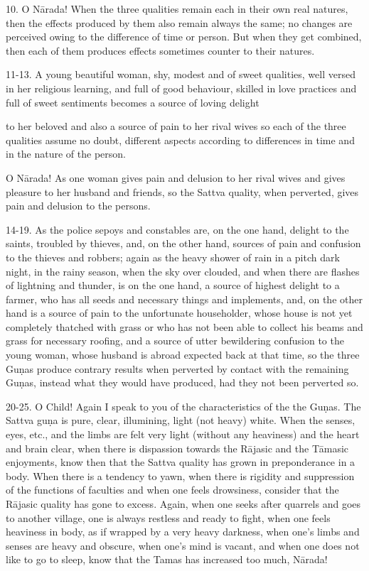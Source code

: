 10. O N\=arada! When the three qualities remain each in their own real natures, then the effects produced by them also remain always the same; no changes are perceived owing to the difference of time or person. But when they get combined, then each of them produces effects sometimes counter to their natures.

11-13. A young beautiful woman, shy, modest and of sweet qualities, well versed in her religious learning, and full of good behaviour, skilled in love practices and full of sweet sentiments becomes a source of loving delight

to her beloved and also a source of pain to her rival wives so each of the three qualities assume no doubt, different aspects according to differences in time and in the nature of the person.

O N\=arada! As one woman gives pain and delusion to her rival wives and gives pleasure to her husband and friends, so the Sattva quality, when perverted, gives pain and delusion to the persons.

14-19. As the police sepoys and constables are, on the one hand, delight to the saints, troubled by thieves, and, on the other hand, sources of pain and confusion to the thieves and robbers; again as the heavy shower of rain in a pitch dark night, in the rainy season, when the sky over clouded, and when there are flashes of lightning and thunder, is on the one hand, a source of highest delight to a farmer, who has all seeds and necessary things and implements, and, on the other hand is a source of pain to the unfortunate householder, whose house is not yet completely thatched with grass or who has not been able to collect his beams and grass for necessary roofing, and a source of utter bewildering confusion to the young woman, whose husband is abroad expected back at that time, so the three Gu\d{n}as produce contrary results when perverted by contact with the remaining Gu\d{n}as, instead what they would have produced, had they not been perverted so.

20-25. O Child! Again I speak to you of the characteristics of the the Gu\d{n}as. The Sattva gu\d{n}a is pure, clear, illumining, light (not heavy) white. When the senses, eyes, etc., and the limbs are felt very light (without any heaviness) and the heart and brain clear, when there is dispassion towards the R\=ajasic and the T\=amasic enjoyments, know then that the Sattva quality has grown in preponderance in a body. When there is a tendency to yawn, when there is rigidity and suppression of the functions of faculties and when one feels drowsiness, consider that the R\=ajasic quality has gone to excess. Again, when one seeks after quarrels and goes to another village, one is always restless and ready to fight, when one feels heaviness in body, as if wrapped by a very heavy darkness, when one's limbs and senses are heavy and obscure, when one's mind is vacant, and when one does not like to go to sleep, know that the Tamas has increased too much, N\=arada!

